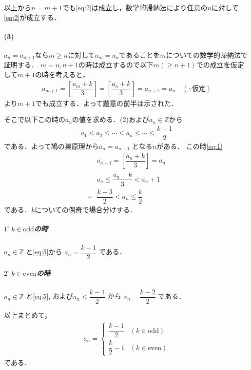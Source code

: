 \documentclass[../../main.tex]{subfiles}
\begin{document}
以上から$n=m+1$でも\cref{eq:2}は成立し，数学的帰納法により任意の$n$に対して\cref{eq:2}が成立する．

\paragraph{(3)}

$a_n=a_{n+1}$なら$m \ge n$に対して$a_m=a_n$であることを$m$についての数学的帰納法で証明する．
$m=n,n+1$の時は成立するので以下$m (\ge n+1)$での成立を仮定して$m+1$の時を考えると，
\begin{align}
  a_{m+1}
  = \left[ \dfrac{a_m + k}{3} \right]
  = \left[ \dfrac{a_n + k}{3} \right]
  = a_{n+1}
  = a_n \quad (\because\text{仮定})
\end{align}
より$m+1$でも成立する．よって題意の前半は示された．

そこで以下この時の$a_n$の値を求める．(2)および$a_n \in \mathbb{Z}$から
\begin{align}
  a_1 \le a_2 \le \cdots \le a_n \le \cdots \le \dfrac{k-1}{2}
\end{align}
である．よって鳩の巣原理から$a_n = a_{n+1}$ となる$n$がある．
この時\cref{eq:1}
\begin{align}
  & a_{n+1} = \left[ \dfrac{a_n + k}{3} \right] = a_n \\
  & a_n \le \dfrac{a_n + k}{3} < a_n + 1 \\
  \therefore
  & \dfrac{k-3}{2} < a_n \le \dfrac{k}{2}  \label{eq:5}
\end{align}
である．$k$についての偶奇で場合分けする．

\subparagraph{$1^\circ \ k \in \text{odd}$の時}

$a_n \in \mathbb{Z}$ と\cref{eq:5}から $a_n = \dfrac{k-1}{2}$ である．

\subparagraph{$2^\circ \ k \in \text{even}$の時}

$a_n \in \mathbb{Z}$ と\cref{eq:5}, および$a_n \le \dfrac{k-1}{2}$ から $a_n = \dfrac{k-2}{2}$ である．
\casesend

以上まとめて，
\begin{align}
  a_n =
  \begin{cases}
    \dfrac{k-1}{2} & (k \in \text{odd}) \\
    \dfrac{k}{2} - 1 & (k \in \text{even})
  \end{cases}
\end{align}
である．
\end{document}

